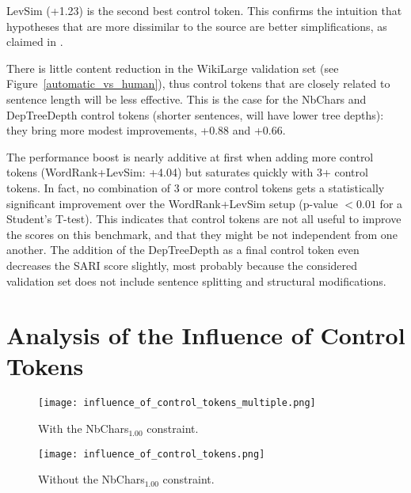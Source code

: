 \documentclass[10pt, a4paper]{article}
\begin{document}
LevSim (+1.23) is the second best control token. This confirms the intuition that hypotheses that are more dissimilar to the source are better simplifications, as claimed in \cite{wubben2012sentence,nisioi2017exploring}.

There is little content reduction in the WikiLarge validation set (see Figure~\ref{automatic_vs_human}), thus control tokens that are closely related to sentence length will be less effective. This is the case for the NbChars and DepTreeDepth control tokens (shorter sentences, will have lower tree depths): they bring more modest improvements, +0.88 and +0.66.

The performance boost is nearly additive at first when adding more control tokens (WordRank+LevSim: +4.04) but saturates quickly with 3+ control tokens. In fact, no combination of 3 or more control tokens gets a statistically significant improvement over the WordRank+LevSim setup (p-value $< 0.01$ for a Student's T-test).
This indicates that control tokens are not all useful to improve the scores on this benchmark, and that they might be not independent from one another.
The addition of the DepTreeDepth as a final control token even decreases the SARI score slightly, most probably because the considered validation set does not include sentence splitting and structural modifications.


\section{Analysis of the Influence of Control Tokens}


\begin{figure*}
    \begin{subfigure}[!htbb]{\textwidth}
        \centering
        \texttt{[image: influence\_of\_control\_tokens\_multiple.png]}
        \caption{With the NbChars$_{1.00}$ constraint.\label{influence_of_control_tokens_with}}
    \end{subfigure}
    \begin{subfigure}[!htbp]{\textwidth}
        \centering
        \texttt{[image: influence\_of\_control\_tokens.png]}
        \caption{Without the NbChars$_{1.00}$ constraint.\label{influence_of_control_tokens_without}}
    \end{subfigure}
    \caption{Influence of each control token on the corresponding attributes of the output simplifications. \textbf{Rows represent control tokens} (each model is trained either only with one control token or with one control token and the NbChars$_{1.00}$ constraint), \textbf{columns represent output attributes} of the predictions and \textbf{colors represent the fixed target ratio} of the control token (yellow=0.25, blue=0.50, violet=0.75, red=1.00, green=Ground truth). We plot the results on the 2000 validation sentences. Figure~\ref{influence_of_control_tokens_with} uses the  NbChars$_{1.00}$ constraint, whereas Figure~\ref{influence_of_control_tokens_without} doesn't.\label{influence_of_control_tokens}}
\end{figure*}
\end{document}
